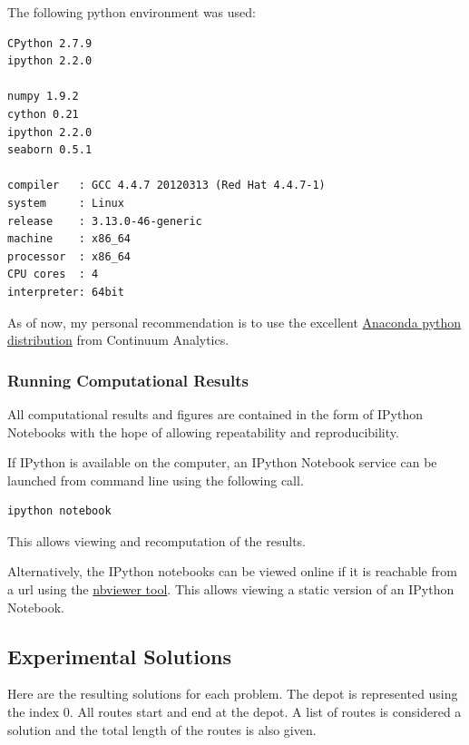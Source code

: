 \documentclass{article} %
\begin{document}
The following python environment was used:

\begin{verbatim}
CPython 2.7.9
ipython 2.2.0

numpy 1.9.2
cython 0.21
ipython 2.2.0
seaborn 0.5.1

compiler   : GCC 4.4.7 20120313 (Red Hat 4.4.7-1)
system     : Linux
release    : 3.13.0-46-generic
machine    : x86_64
processor  : x86_64
CPU cores  : 4
interpreter: 64bit

\end{verbatim}

As of now, my personal recommendation is to use the excellent \href{http://continuum.io/downloads}{Anaconda python distribution} from Continuum Analytics.


\subsubsection{Running Computational Results}

All computational results and figures are contained in the form of IPython Notebooks with the hope of allowing repeatability and reproducibility.


If IPython is available on the computer, an IPython Notebook service can be launched from command line using the following call.

\begin{verbatim}
ipython notebook    
\end{verbatim}

This allows viewing and recomputation of the results.\newline


Alternatively, the IPython notebooks can be viewed online if it is reachable from a url using the \href{http://nbviewer.IPython.org/}{nbviewer tool}. This allows viewing a static version of an IPython Notebook.



\newpage
\subsection{Experimental Solutions}
Here are the resulting solutions for each problem. The depot is represented using the index 0. All routes start and end at the depot. A list of routes is considered a solution and the total length of the routes is also given.
\end{document}
